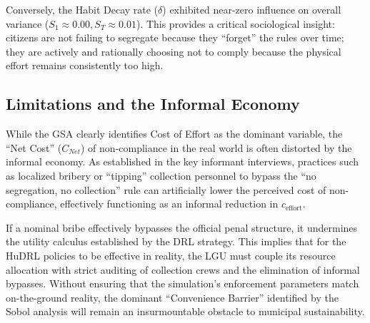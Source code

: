 Conversely, the Habit Decay rate ($\delta$) exhibited near-zero influence on overall variance ($S_1 \approx 0.00, S_T \approx 0.01$). This provides a critical sociological insight: citizens are not failing to segregate because they ``forget'' the rules over time; they are actively and rationally choosing not to comply because the physical effort remains consistently too high. 

\subsection{Limitations and the Informal Economy}

While the GSA clearly identifies Cost of Effort as the dominant variable, the ``Net Cost'' ($C_{Net}$) of non-compliance in the real world is often distorted by the informal economy. As established in the key informant interviews, practices such as localized bribery or ``tipping'' collection personnel to bypass the ``no segregation, no collection'' rule can artificially lower the perceived cost of non-compliance, effectively functioning as an informal reduction in $c_{\text{effort}}$.

If a nominal bribe effectively bypasses the official penal structure, it undermines the utility calculus established by the DRL strategy. This implies that for the HuDRL policies to be effective in reality, the LGU must couple its resource allocation with strict auditing of collection crews and the elimination of informal bypasses. Without ensuring that the simulation's enforcement parameters match on-the-ground reality, the dominant ``Convenience Barrier'' identified by the Sobol analysis will remain an insurmountable obstacle to municipal sustainability.

